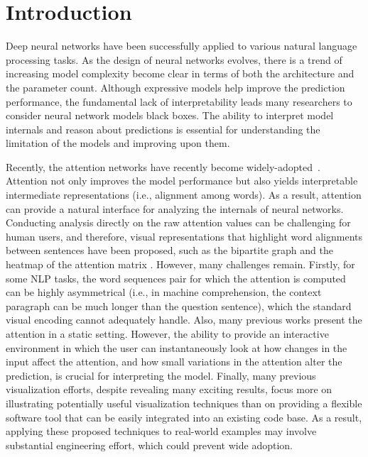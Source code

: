 \section{Introduction}

Deep neural networks have been successfully applied to various natural language processing tasks.
As the design of neural networks evolves, there is a trend of increasing model complexity become clear in terms of both the architecture and the parameter count. 
%
Although expressive models help improve the prediction performance, the fundamental lack of interpretability leads many researchers to consider neural network models black boxes. 
%
The ability to interpret model internals and reason about predictions is essential for understanding the limitation of the models and improving upon them.


Recently, the attention networks have recently become  widely-adopted~\cite{bahdanau2014neural,seo2016bidirectional,Parikh2016, VaswaniShazeerParmar2017}. Attention not only improves the model performance but also yields interpretable intermediate representations (i.e., alignment among words). As a result, attention can provide a natural interface for analyzing the internals of neural networks. Conducting analysis directly on the raw attention values can be challenging for human users, and therefore, visual representations that highlight word alignments between sentences have been proposed, such as the bipartite graph and the heatmap of the attention matrix \cite{LiChenHovy2015, li2016understanding, lee2017interactive}.  However, many challenges remain. Firstly, for some NLP tasks, the word sequences pair for which the attention is computed can be highly asymmetrical (i.e., in machine comprehension, the context paragraph can be much longer than the question sentence), which the standard visual encoding cannot adequately handle.  Also, many previous works present the attention in a static setting. However, the ability to provide an interactive environment in which the user can instantaneously look at how changes in the input affect the attention, and how small variations in the attention alter the prediction, is crucial for interpreting the model. Finally, many previous visualization efforts, despite revealing many exciting results, focus more on illustrating potentially useful visualization techniques than on providing a flexible software tool that can be easily integrated into an existing code base. As a result, applying these proposed techniques to real-world examples may involve substantial engineering effort, which could prevent wide adoption.

